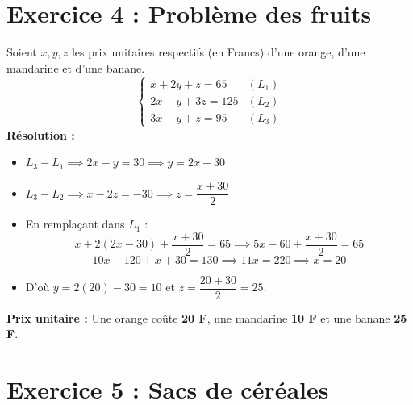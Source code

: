\documentclass[12pt,a4paper]{article}
\begin{document}
\vspace{0.3cm}

\section*{Exercice 4 : Problème des fruits}

Soient $x, y, z$ les prix unitaires respectifs (en Francs) d'une orange, d'une mandarine et d'une banane.
\[
\begin{cases}
x + 2y + z = 65 & (L_1) \\
2x + y + 3z = 125 & (L_2) \\
3x + y + z = 95 & (L_3)
\end{cases}
\]
\textbf{Résolution :}
\begin{itemize}[label=$\bullet$]
    \item $L_3 - L_1 \implies 2x - y = 30 \implies y = 2x - 30$
    \item $L_3 - L_2 \implies x - 2z = -30 \implies z = \dfrac{x + 30}{2}$
    \item En remplaçant dans $L_1$ :
    \[
    x + 2(2x - 30) + \frac{x + 30}{2} = 65 \implies 5x - 60 + \frac{x + 30}{2} = 65
    \]
    \[
    10x - 120 + x + 30 = 130 \implies 11x = 220 \implies x = 20
    \]
    \item D'où $y = 2(20) - 30 = 10$ et $z = \dfrac{20 + 30}{2} = 25$.
\end{itemize}
\textbf{Prix unitaire :} Une orange coûte \textbf{20 F}, une mandarine \textbf{10 F} et une banane \textbf{25 F}.

\vspace{0.3cm}

\section*{Exercice 5 : Sacs de céréales}
\end{document}
